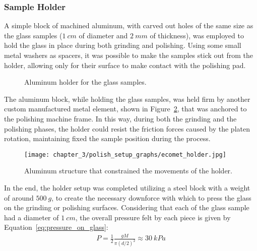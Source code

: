 \subsubsection{Sample Holder}
\label{subsubsec:sample_holder}
A simple block of machined aluminum, with carved out holes of the same size as the glass samples ($1\: cm$ of diameter and $2\: mm$ of thickness), was employed to hold the glass in place during both grinding and polishing. Using some small metal washers as spacers, it was possible to make the samples stick out from the holder, allowing only for their surface to make contact with the polishing pad. 

\begin{figure}[H]
    \centering
    \quad
    \caption{Aluminum holder for the glass samples. }
    \label{fig:holder}
\end{figure}
The aluminum block, while holding the glass samples, was held firm by another custom manufactured metal element, shown in Figure~\ref{fig:aluminum_structure}, that was anchored to the polishing machine frame. In this way, during both the grinding and the polishing phases, the holder could resist the friction forces caused by the 
platen rotation, maintaining fixed the sample position during the process.
\begin{figure}[H]
    \centering
    \texttt{[image: chapter\_3/polish\_setup\_graphs/ecomet\_holder.jpg]} 
    \caption{Aluminum structure that constrained the movements of the holder.}
    \label{fig:aluminum_structure}
\end{figure}
In the end, the holder setup was completed utilizing a steel block with a weight of around $500\: g$, to create the necessary downforce with which to press the glass on the grinding or polishing surfaces. Considering that each of the glass sample had a diameter of $1\:cm$, the overall pressure felt by each piece is given by Equation~\ref{eq:pressure_on_glass}:
\begin{align}
    P=\frac{1}{2}\frac{gM}{\pi\left(d/2\right)^2}\approx30\ kPa \label{eq:pressure_on_glass}
\end{align}

